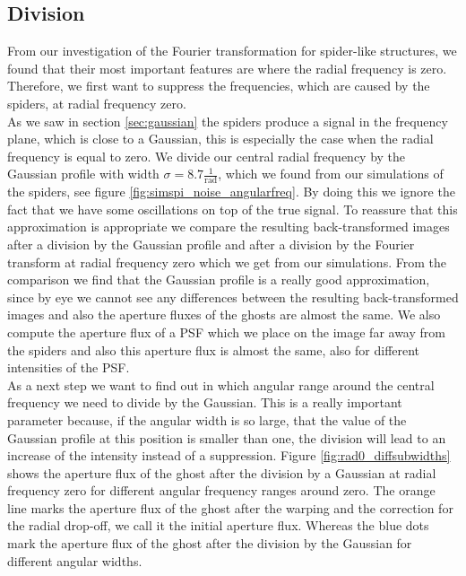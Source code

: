 \subsection{Division}
\label{sec:suppression_division}
From our investigation of the Fourier transformation for spider-like structures, we found that their most important features are where the radial frequency is zero. Therefore, we first want to suppress the frequencies, which are caused by the spiders, at radial frequency zero.\\
As we saw in section \ref{sec:gaussian} the spiders produce a signal in the frequency plane, which is close to a Gaussian, this is especially the case when the radial frequency is equal to zero. We divide our central radial frequency by the Gaussian profile with width $\sigma = 8.7 \frac{1}{\mathrm{rad}}$, which we found from our simulations of the spiders, see figure \ref{fig:simspi_noise_angularfreq}. By doing this we ignore the fact that we have some oscillations on top of the true signal. To reassure that this approximation is appropriate we compare the resulting back-transformed images after a division by the Gaussian profile and after a division by the Fourier transform at radial frequency zero which we get from our simulations. From the comparison we find that the Gaussian profile is a really good approximation, since by eye we cannot see any differences between the resulting back-transformed images and also the aperture fluxes of the ghosts are almost the same. We also compute the aperture flux of a PSF which we place on the image far away from the spiders and also this aperture flux is almost the same, also for different intensities of the PSF.\\
As a next step we want to find out in which angular range around the central frequency we need to divide by the Gaussian. This is a really important parameter because, if the angular width is so large, that the value of the Gaussian profile at this position is smaller than one, the division will lead to an increase of the intensity instead of a suppression. Figure \ref{fig:rad0_diffsubwidths} shows the aperture flux of the ghost after the division by a Gaussian at radial frequency zero for different angular frequency ranges around zero. The orange line marks the aperture flux of the ghost after the warping and the correction for the radial drop-off, we call it the initial aperture flux. Whereas the blue dots mark the aperture flux of the ghost after the division by the Gaussian for different angular widths.\\
